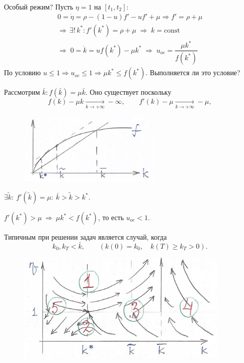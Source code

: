\documentclass[12pt, a4paper]{article}
\theoremstyle{rusdef}
\DeclareMathOperator*{\thus}{\Rightarrow} %
\DeclareMathOperator*{\To}{\longrightarrow}
\begin{document}
Особый режим? Пусть $\eta = 1$ на $[t_1, t_2]\colon$
\begin{gather*}
  0 = \dot{\eta} = \rho - (1-u)f' - uf' + \mu \thus f' = \rho + \mu \\
  \thus \,\exists!\, k^* \colon f'(k^*) = \rho + \mu \;\thus\; k = \mathrm{const} \\
  \thus\; 0 = \dot{k} = u f(k^*) - \mu k^* \;\thus\; u_{oc} = \dfrac{\mu k^*}{f(k^*)}
\end{gather*}
По условию $u \leqslant 1 \thus u_{oc} \leqslant 1 \thus \mu k^* \leqslant f(k^*)$. Выполняется ли это условие?


Рассмотрим $\bar{k} \colon f(\bar{k}) = \mu \bar{k}$. Оно существует поскольку
\[
  f(k) - \mu k \To\limits_{k \to +\infty} -\infty, \qquad f'(k) - \mu \To\limits_{k \to +\infty} - \mu,
\]

\begin{figure}[ht]
  \center
  \includegraphics{pic2.png}
\end{figure}

$\exists \tilde{k} \colon\: f'(\tilde{k}) = \mu \colon\: \bar{k} > \tilde{k} > k^*$.

$f'(k^*) > \mu \:\thus\: \mu k^* < f(k^*)$, то есть $u_{oc} < 1$.

Типичным при решении задач является случай, когда
\[
  k_0, k_T < \bar{k}, \qquad (k(0) = k_0, \quad k(T) \geqslant k_T > 0).
\]

\begin{figure}[ht]
  \center
  \includegraphics{pic3.png}
\end{figure}
\end{document}
